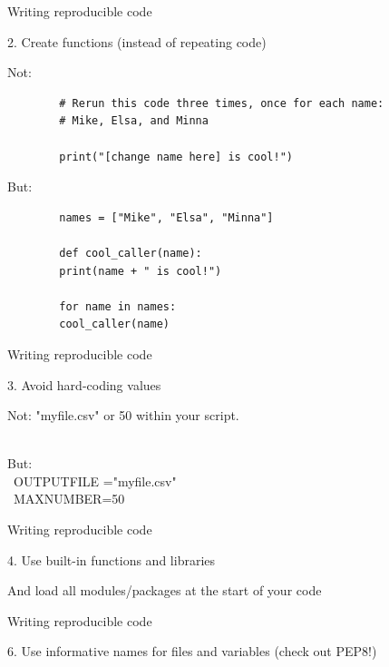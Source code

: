 \documentclass[compress]{beamer}
\begin{document}
\begin{frame}[fragile]{Writing reproducible code}
	
	2. Create functions  (instead of repeating code)
	
	Not:
	\begin{lstlisting}		
		# Rerun this code three times, once for each name:
		# Mike, Elsa, and Minna
		
		print("[change name here] is cool!")
	\end{lstlisting}
	
	But:
	\begin{lstlisting}		
		names = ["Mike", "Elsa", "Minna"]
		
		def cool_caller(name):
		print(name + " is cool!")
		
		for name in names:
		cool_caller(name)
	\end{lstlisting}
	
	
\end{frame}

\begin{frame}{Writing reproducible code}
	
	3. Avoid hard-coding values
	
	Not:
	"myfile.csv" or 50 within your script. \\\
	
	But: \\\
	OUTPUTFILE ="myfile.csv" \\\
	MAXNUMBER=50
\end{frame}



\begin{frame}{Writing reproducible code}
	
	4. Use built-in functions and libraries 
	
	And load all modules/packages at the start of your code
	
	
	
\end{frame}

\begin{frame}{Writing reproducible code}
	
	6. Use informative names for files and variables (check out PEP8!)
	
\end{frame}
\end{document}
